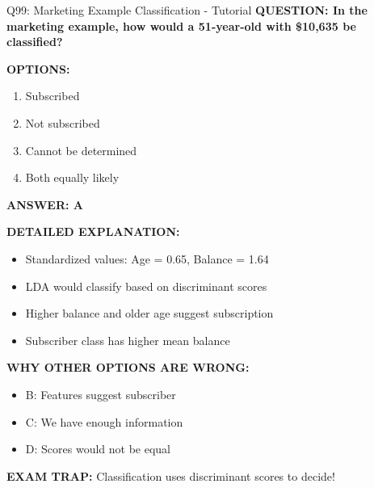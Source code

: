 \documentclass[8pt]{beamer}
\begin{document}
	\begin{frame}{Q99: Marketing Example Classification - Tutorial}
		\fontsize{6.5}{7.5}\selectfont
		\textbf{QUESTION: In the marketing example, how would a 51-year-old with \$10,635 be classified?}
		
		\vspace{0.1cm}
		\textbf{OPTIONS:}
		\begin{enumerate}
			\item Subscribed
			\item Not subscribed
			\item Cannot be determined
			\item Both equally likely
		\end{enumerate}
		
		\vspace{0.1cm}
		\textcolor{myblue}{\textbf{ANSWER: A}}
		
		\vspace{0.1cm}
		\textbf{DETAILED EXPLANATION:}
		\begin{itemize}
			\item Standardized values: Age = 0.65, Balance = 1.64
			\item LDA would classify based on discriminant scores
			\item Higher balance and older age suggest subscription
			\item Subscriber class has higher mean balance
		\end{itemize}
		
		\vspace{0.1cm}
		\textcolor{myred}{\textbf{WHY OTHER OPTIONS ARE WRONG:}}
		\begin{itemize}
			\item \textcolor{myred}{B:} Features suggest subscriber
			\item \textcolor{myred}{C:} We have enough information
			\item \textcolor{myred}{D:} Scores would not be equal
		\end{itemize}
		
		\textcolor{myred}{\textbf{EXAM TRAP:}} Classification uses \textcolor{myblue}{discriminant scores} to decide!
	\end{frame}
	
\end{document}
